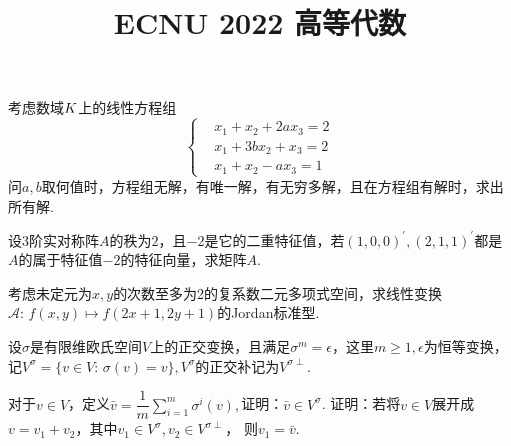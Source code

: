 \documentclass{BHCexam}[windows]
\let\mathbb\relax %
\begin{document}
	
	\title{ECNU 2022 高等代数}
	
	\maketitle
	
	\begin{groups}
        \begin{questions}
            \question
            考虑数域$\mathbb{K}$上的线性方程组
            \begin{equation*}
                \left\{ 
                \begin{aligned}
                    &x_1 + x_2 + 2a x_3 = 2 \\
                    &x_1 + 3b x_2 + x_3= 2 \\
                    &x_1 + x_2 - a x_3 = 1
                \end{aligned}
                \right.
            \end{equation*}
            问$a,b$取何值时，方程组无解，有唯一解，有无穷多解，且在方程组有解时，求出所有解.
        \end{questions}

        \begin{questions}
            \question
            设3阶实对称阵$A$的秩为$2$，且$-2$是它的二重特征值，若$(1,0,0)^\prime, (2,1,1)^\prime$都是
            $A$的属于特征值$-2$的特征向量，求矩阵$A$.
        \end{questions}

        \begin{questions}
            \question 
            考虑未定元为$x,y$的次数至多为2的复系数二元多项式空间，求线性变换$\mathscr{A}: \, f(x,y) \mapsto 
            f(2x+1,2y+1)$的Jordan标准型.
        \end{questions}

        \begin{questions}
            \question
            设$\sigma$是有限维欧氏空间$V$上的正交变换，且满足$\sigma^m=\epsilon$，这里$m \geq 1, \epsilon$为恒等变换，
            记$V^\sigma = \{ v \in V: \, \sigma(v) = v \},V^\sigma$的正交补记为$V^{\sigma \perp}$.
            \begin{subquestions}
                \subquestion 对于$v \in V$，定义$\bar{v}=\dfrac{1}{m} \sum \limits_{i=1}^m \sigma^i(v),$证明：$\bar{v} \in V^\sigma$.
                \subquestion 证明：若将$v\in V$展开成$v = v_1 + v_2$，其中$v_1 \in V^\sigma, v_2\in V^{\sigma \perp}$，
                则$v_1 = \bar{v}$.
            \end{subquestions}
        \end{questions}


\end{groups}
\end{document}
